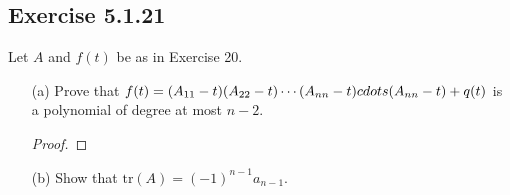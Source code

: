 \subsection*{Exercise 5.1.21} Let \( A  \) and \( f(t)  \) be as in Exercise 20.
\begin{enumerate}
    \item[(a)] Prove that \( f(t) = ({A}_{11} - t)({A}_{22} - t) \cdots ({A}_{n n } - t) \\cdots ({A}_{n n } - t) + q(t) \) is a polynomial of degree at most \( n - 2  \). 
        \begin{proof}
        
        \end{proof}
    \item[(b)] Show that \( \text{tr}(A) = (-1)^{n-1} {a}_{n-1} \).
\end{enumerate}
